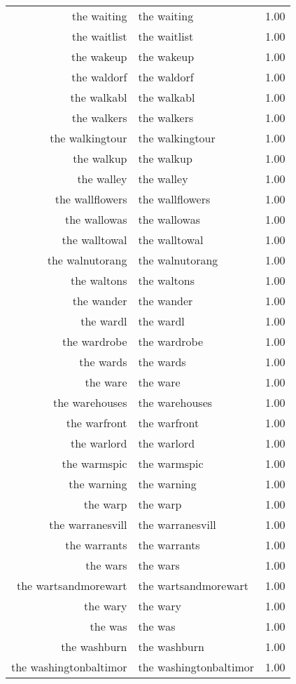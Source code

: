 \begin{table}[ht]
\begin{tabular}{rlr}
  the waiting & the waiting & 1.00 \\ 
  the waitlist & the waitlist & 1.00 \\ 
  the wakeup & the wakeup & 1.00 \\ 
  the waldorf & the waldorf & 1.00 \\ 
  the walkabl & the walkabl & 1.00 \\ 
  the walkers & the walkers & 1.00 \\ 
  the walkingtour & the walkingtour & 1.00 \\ 
  the walkup & the walkup & 1.00 \\ 
  the walley & the walley & 1.00 \\ 
  the wallflowers & the wallflowers & 1.00 \\ 
  the wallowas & the wallowas & 1.00 \\ 
  the walltowal & the walltowal & 1.00 \\ 
  the walnutorang & the walnutorang & 1.00 \\ 
  the waltons & the waltons & 1.00 \\ 
  the wander & the wander & 1.00 \\ 
  the wardl & the wardl & 1.00 \\ 
  the wardrobe & the wardrobe & 1.00 \\ 
  the wards & the wards & 1.00 \\ 
  the ware & the ware & 1.00 \\ 
  the warehouses & the warehouses & 1.00 \\ 
  the warfront & the warfront & 1.00 \\ 
  the warlord & the warlord & 1.00 \\ 
  the warmspic & the warmspic & 1.00 \\ 
  the warning & the warning & 1.00 \\ 
  the warp & the warp & 1.00 \\ 
  the warranesvill & the warranesvill & 1.00 \\ 
  the warrants & the warrants & 1.00 \\ 
  the wars & the wars & 1.00 \\ 
  the wartsandmorewart & the wartsandmorewart & 1.00 \\ 
  the wary & the wary & 1.00 \\ 
  the was & the was & 1.00 \\ 
  the washburn & the washburn & 1.00 \\ 
  the washingtonbaltimor & the washingtonbaltimor & 1.00 \\ 

\end{tabular}
\end{table}
